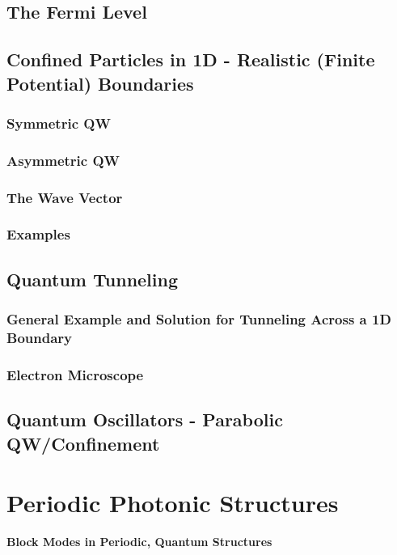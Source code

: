 \documentclass[colorlinks,11pt,a4paper,normalphoto,withhyper,ragged2e]{altareport}
\renewcommand{\ReportSectionFont}{\LARGE\rmfamily\bfseries} %
\begin{document}
	
	\subsection{The Fermi Level}
	
	
	\subsection{Confined Particles in 1D - Realistic (Finite Potential) Boundaries}
	
		\subsubsection{Symmetric QW}
		
		
		\subsubsection{Asymmetric QW}
		
		
		\subsubsection{The Wave Vector}
		
		
		\subsubsection{Examples}
		
		
	\subsection{Quantum Tunneling}
	
		\subsubsection{General Example and Solution for Tunneling Across a 1D Boundary}
		
		
		\subsubsection{Electron Microscope}
		
		
	\subsection{Quantum Oscillators - Parabolic QW/Confinement}
	
	
	\pagebreak
	
	
	
	
\section{Periodic Photonic Structures}\vskip0pt
	{\quad\quad\color{heading}\ReportSectionFont{Block Modes in Periodic, Quantum Structures}}
		
\end{document}
